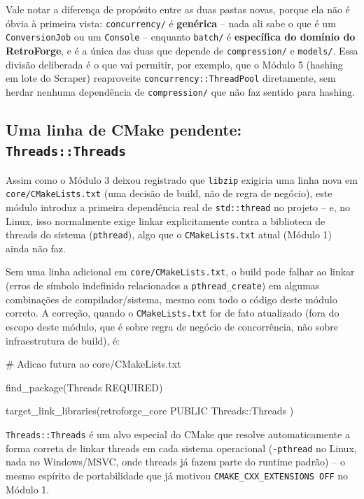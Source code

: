 \begin{CaixaInfo}
Vale notar a diferença de propósito entre as duas pastas novas, porque ela não é óbvia à primeira vista: \texttt{concurrency/} é \textbf{genérica} -- nada ali sabe o que é um \texttt{ConversionJob} ou um \texttt{Console} -- enquanto \texttt{batch/} é \textbf{específica do domínio do RetroForge}, e é a única das duas que depende de \texttt{compression/} e \texttt{models/}. Essa divisão deliberada é o que vai permitir, por exemplo, que o Módulo 5 (hashing em lote do Scraper) reaproveite \texttt{concurrency::ThreadPool} diretamente, sem herdar nenhuma dependência de \texttt{compression/} que não faz sentido para hashing.
\end{CaixaInfo}

\subsection{Uma linha de CMake pendente: \texttt{Threads::Threads}}

Assim como o Módulo 3 deixou registrado que \texttt{libzip} exigiria uma linha nova em \texttt{core/CMakeLists.txt} (uma decisão de build, não de regra de negócio), este módulo introduz a primeira dependência real de \texttt{std::thread} no projeto -- e, no Linux, isso normalmente exige linkar explicitamente contra a biblioteca de threads do sistema (\texttt{pthread}), algo que o \texttt{CMakeLists.txt} atual (Módulo 1) ainda não faz.

\begin{CaixaAlerta}
Sem uma linha adicional em \texttt{core/CMakeLists.txt}, o build pode falhar ao linkar (erros de símbolo indefinido relacionados a \texttt{pthread\_create}) em algumas combinações de compilador/sistema, mesmo com todo o código deste módulo correto. A correção, quando o \texttt{CMakeLists.txt} for de fato atualizado (fora do escopo deste módulo, que é sobre regra de negócio de concorrência, não sobre infraestrutura de build), é:
\begin{CaixaCodigo}
# Adicao futura ao core/CMakeLists.txt

find_package(Threads REQUIRED)

target_link_libraries(retroforge_core PUBLIC
    Threads::Threads
)
\end{CaixaCodigo}
\texttt{Threads::Threads} é um alvo especial do CMake que resolve automaticamente a forma correta de linkar threads em cada sistema operacional (\texttt{-pthread} no Linux, nada no Windows/MSVC, onde threads já fazem parte do runtime padrão) -- o mesmo espírito de portabilidade que já motivou \texttt{CMAKE\_CXX\_EXTENSIONS OFF} no Módulo 1.
\end{CaixaAlerta}

